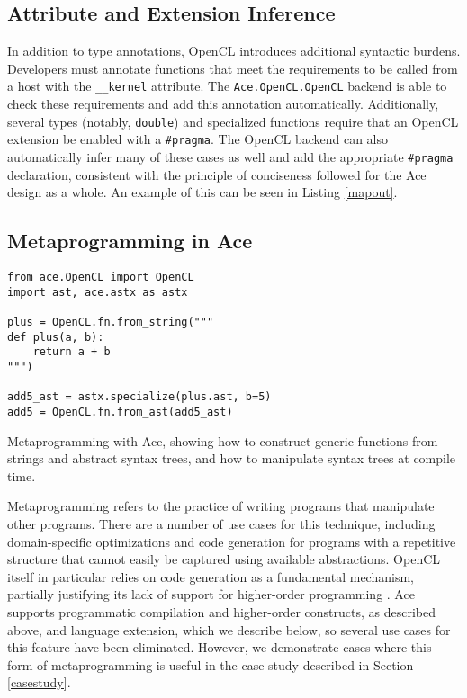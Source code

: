 \documentclass[10pt, conference, compsocconf]{IEEEtran}
\begin{document}
\subsection{Attribute and Extension Inference}
In addition to type annotations, OpenCL introduces additional syntactic burdens. Developers must annotate functions that meet the requirements to be called from a host with the \verb|__kernel| attribute. The \verb|Ace.OpenCL.OpenCL| backend is able to check these requirements and add this annotation automatically. Additionally, several types (notably, \verb|double|) and specialized functions require that an OpenCL extension be enabled with a \verb|#pragma|. The OpenCL backend can also  automatically infer many of these cases as well and add the appropriate \verb|#pragma| declaration, consistent with the principle of conciseness followed for the Ace design as a whole. An example of this can be seen in Listing \ref{mapout}.

\subsection{Metaprogramming in Ace}
\begin{codelisting}
\begin{lstlisting}[commentstyle=\color{mauve}]
from ace.OpenCL import OpenCL
import ast, ace.astx as astx

plus = OpenCL.fn.from_string("""
def plus(a, b):
    return a + b
""")

add5_ast = astx.specialize(plus.ast, b=5)
add5 = OpenCL.fn.from_ast(add5_ast)
\end{lstlisting}
\caption{Metaprogramming with Ace, showing how to construct generic functions from strings and abstract syntax trees, and how to manipulate syntax trees at compile time.}
\label{metaprogramming}
\end{codelisting}
Metaprogramming refers to the practice of writing programs that manipulate other programs. There are a number of use cases for this technique, including domain-specific optimizations and code generation for programs with a repetitive structure that cannot easily be captured using available abstractions. OpenCL itself in particular relies on code generation as a fundamental mechanism, partially justifying its lack of support for higher-order programming \cite{pyopencl}. Ace supports programmatic compilation and higher-order constructs, as described above, and language extension, which we describe below, so several use cases for this feature have been eliminated. However, we demonstrate cases where this form of metaprogramming is useful in the case study described in Section \ref{casestudy}.
\end{document}
